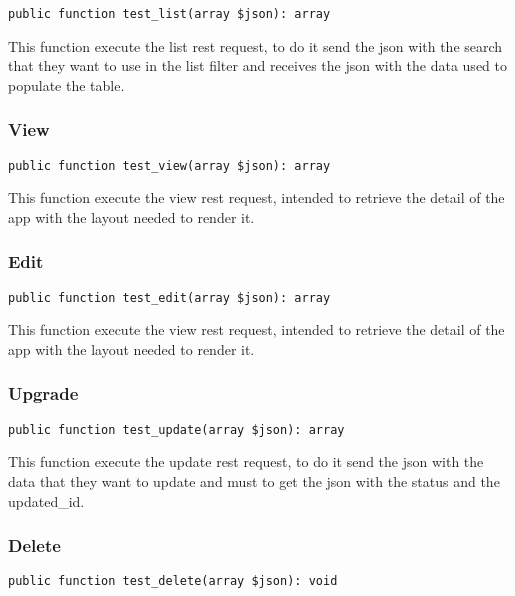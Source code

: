 \documentclass[a4paper]{article}
\begin{document}
\begin{lstlisting}
public function test_list(array $json): array
\end{lstlisting}

This function execute the list rest request, to do it send the json with
the search that they want to use in the list filter and receives the json
with the data used to populate the table.

\hypertarget{toc62}{}
\subsubsection{View}

\begin{lstlisting}
public function test_view(array $json): array
\end{lstlisting}

This function execute the view rest request, intended to retrieve the detail
of the app with the layout needed to render it.

\hypertarget{toc63}{}
\subsubsection{Edit}

\begin{lstlisting}
public function test_edit(array $json): array
\end{lstlisting}

This function execute the view rest request, intended to retrieve the detail
of the app with the layout needed to render it.

\hypertarget{toc64}{}
\subsubsection{Upgrade}

\begin{lstlisting}
public function test_update(array $json): array
\end{lstlisting}

This function execute the update rest request, to do it send the json with
the data that they want to update and must to get the json with the status
and the updated\_id.

\hypertarget{toc65}{}
\subsubsection{Delete}

\begin{lstlisting}
public function test_delete(array $json): void
\end{lstlisting}
\end{document}
